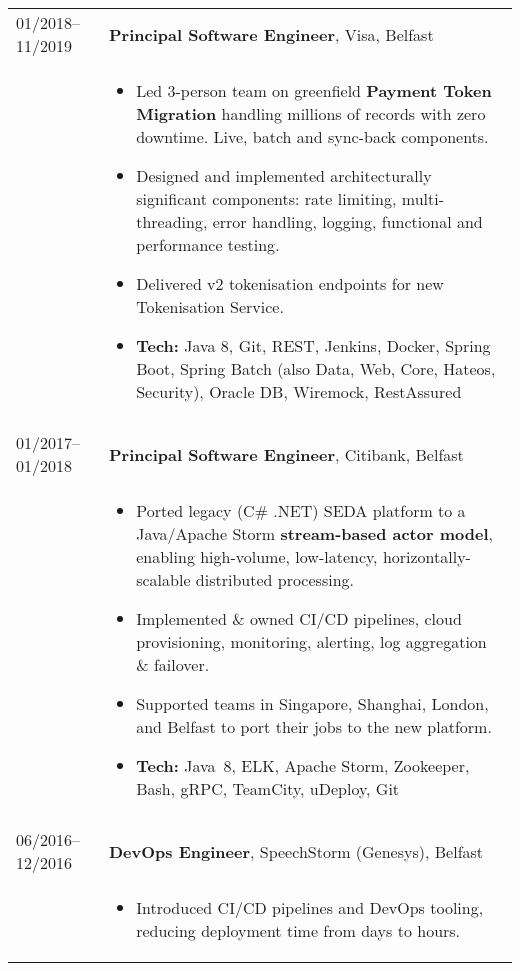 \documentclass[2pt,a4paper]{article}
\newlength{\datecolumn}
\newlength{\textcolumn}
\begin{document}
\begin{longtable}{p{\datecolumn} p{\textcolumn}}
01/2018--11/2019 & \textbf{Principal Software Engineer}, Visa, Belfast \\
                 & \begin{itemize}
                         \item Led 3-person team on greenfield \textbf{Payment Token Migration} handling millions of records with zero downtime. Live, batch and sync-back components.
                         \item Designed and implemented architecturally significant components: rate limiting, multi-threading, error handling, logging, functional and performance testing.
                         \item Delivered v2 tokenisation endpoints for new Tokenisation Service.
                         \item \textbf{Tech:} Java 8, Git, REST, Jenkins, Docker, Spring Boot, Spring Batch (also Data, Web, Core, Hateos, Security), Oracle DB, Wiremock, RestAssured
                   \end{itemize} \\ \\
01/2017--01/2018 & \textbf{Principal Software Engineer}, Citibank, Belfast \\
                 & \begin{itemize}
                         \item Ported legacy (C\# .NET) SEDA platform to a Java/Apache Storm \textbf{stream-based actor model}, enabling high-volume, low-latency, horizontally-scalable distributed processing.
                         \item Implemented \& owned CI/CD pipelines, cloud provisioning, monitoring, alerting, log aggregation \& failover.
                         \item Supported teams in Singapore, Shanghai, London, and Belfast to port their jobs to the new platform.
                         \item \textbf{Tech:} Java~8, ELK, Apache Storm, Zookeeper, Bash, gRPC, TeamCity, uDeploy, Git 
                   \end{itemize} \\ \\
06/2016--12/2016 & \textbf{DevOps Engineer}, SpeechStorm (Genesys), Belfast \\
                 & \begin{itemize}
                         \item Introduced CI/CD pipelines and DevOps tooling, reducing deployment time from days to hours.

\end{itemize}
\end{longtable}
\end{document}
